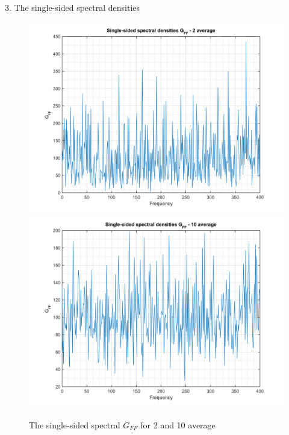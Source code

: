 \documentclass[14pt,a4paper]{article}
\begin{document}
3. The single-sided spectral densities
\begin{figure}[htp]
	\centering
	\includegraphics[scale=0.4]{fn4_VB3_1.png}
	\includegraphics[scale=0.4]{fn4_VB3_3.png}
	\caption{The single-sided spectral $G_{FF}$ for 2 and 10 average}
\end{figure}
\end{document}
